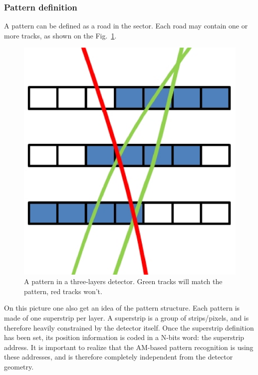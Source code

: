 \subsubsection{Pattern definition}

\noindent A pattern can be defined as a road in the sector. Each road may contain one or more tracks, as shown on the Fig.~\ref{fig:pattern}. 
\begin{figure}[ht!]
\centering
\includegraphics[width=0.3\columnwidth]{Plots/Pattern.eps}
\caption{A pattern in a three-layers detector. Green tracks will match the pattern, red tracks won't.}
\label{fig:pattern}
\end{figure}

\noindent On this picture one also get an idea of the pattern structure. Each pattern is made of one superstrip per layer. A superstrip is a group of strips/pixels, and is therefore heavily constrained by the detector itself. Once the superstrip definition has been set, its position information is coded in a N-bits word: the superstrip address. It is important to realize that the AM-based pattern recognition is using these addresses, and is therefore completely independent from the detector geometry.

